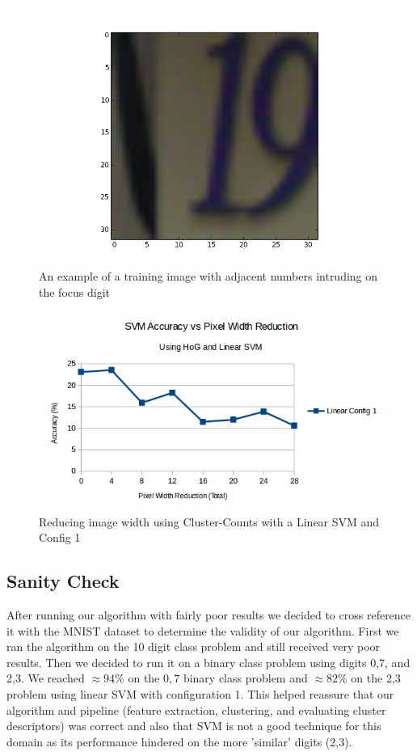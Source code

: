 \documentclass{article} %
\begin{document}
\begin{figure}
\centering
	\includegraphics[scale=0.2]{./plots/manydigits}
    	\caption{An example of a training image with adjacent numbers intruding on the focus digit}
	\label{fig:manydigits}
\end{figure}

\begin{figure}
\centering
	\includegraphics[width=0.8\linewidth]{./plots/svm/trim}
    	\caption{Reducing image width using Cluster-Counts with a Linear SVM and Config 1}
	\label{fig:svmtrim}
\end{figure}

\subsection{Sanity Check}
After running our algorithm with fairly poor results we decided to cross reference it with the MNIST dataset to determine the validity of our algorithm. First we ran the algorithm on the 10 digit class problem and still received very poor results. Then we decided to run it on a binary class problem using digits 0,7, and 2,3. We reached $\approx 94\%$ on the $0,7$ binary class problem and $\approx 82\%$ on the 2,3 problem using linear SVM with configuration 1. This helped reassure that our algorithm and pipeline (feature extraction, clustering, and evaluating cluster descriptors) was correct and also that SVM is not a good technique for this domain as its performance hindered on the more 'similar' digits (2,3).
\end{document}
